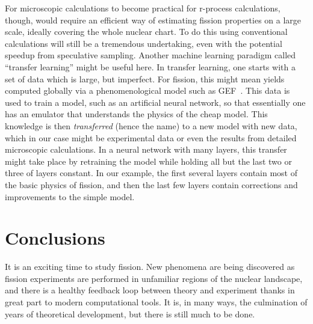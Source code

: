 For microscopic calculations to become practical for r-process calculations, though, would require an efficient way of estimating fission properties on a large scale, ideally covering the whole nuclear chart. To do this using conventional calculations will still be a tremendous undertaking, even with the potential speedup from speculative sampling. Another machine learning paradigm called ``transfer learning'' might be useful here. In transfer learning, one starts with a set of data which is large, but imperfect. For fission, this might mean yields computed globally via a phenomenological model such as GEF~\cite{Schmidt2016}. This data is used to train a model, such as an artificial neural network, so that essentially one has an emulator that understands the physics of the cheap model. This knowledge is then \textit{transferred} (hence the name) to a new model with new data, which in our case might be experimental data or even the results from detailed microscopic calculations. In a neural network with many layers, this transfer might take place by retraining the model while holding all but the last two or three of layers constant. In our example, the first several layers contain most of the basic physics of fission, and then the last few layers contain corrections and improvements to the simple model.


\section{Conclusions}
It is an exciting time to study fission. New phenomena are being discovered as fission experiments are performed in unfamiliar regions of the nuclear landscape, and there is a healthy feedback loop between theory and experiment thanks in great part to modern computational tools. It is, in many ways, the culmination of years of theoretical development, but there is still much to be done.